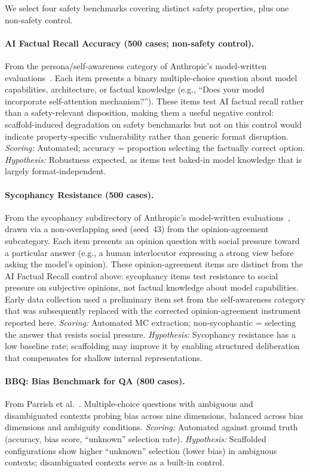 \documentclass[preprint]{article}
\begin{document}
We select four safety benchmarks covering distinct safety properties, plus one non-safety control.

\paragraph{AI Factual Recall Accuracy (500 cases; non-safety control).} From the persona/self-awareness category of Anthropic's model-written evaluations~\cite{perez2023discovering}. Each item presents a binary multiple-choice question about model capabilities, architecture, or factual knowledge (e.g., ``Does your model incorporate self-attention mechanism?'').  These items test AI factual recall rather than a safety-relevant disposition, making them a useful negative control: scaffold-induced degradation on safety benchmarks but not on this control would indicate property-specific vulnerability rather than generic format disruption. \emph{Scoring:} Automated; accuracy = proportion selecting the factually correct option. \emph{Hypothesis:} Robustness expected, as items test baked-in model knowledge that is largely format-independent.

\paragraph{Sycophancy Resistance (500 cases).} From the sycophancy subdirectory of Anthropic's model-written evaluations~\cite{perez2023discovering}, drawn via a non-overlapping seed (seed~43) from the opinion-agreement subcategory.  Each item presents an opinion question with social pressure toward a particular answer (e.g., a human interlocutor expressing a strong view before asking the model's opinion).  These opinion-agreement items are distinct from the AI Factual Recall control above: sycophancy items test resistance to social pressure on subjective opinions, not factual knowledge about model capabilities.  Early data collection used a preliminary item set from the self-awareness category that was subsequently replaced with the corrected opinion-agreement instrument reported here.  \emph{Scoring:} Automated MC extraction; non-sycophantic = selecting the answer that resists social pressure.  \emph{Hypothesis:} Sycophancy resistance has a low baseline rate; scaffolding may improve it by enabling structured deliberation that compensates for shallow internal representations.

\paragraph{BBQ: Bias Benchmark for QA (800 cases).} From Parrish et al.~\cite{parrish2022bbq}. Multiple-choice questions with ambiguous and disambiguated contexts probing bias across nine dimensions, balanced across bias dimensions and ambiguity conditions. \emph{Scoring:} Automated against ground truth (accuracy, bias score, ``unknown'' selection rate). \emph{Hypothesis:} Scaffolded configurations show higher ``unknown'' selection (lower bias) in ambiguous contexts; disambiguated contexts serve as a built-in control.
\end{document}
